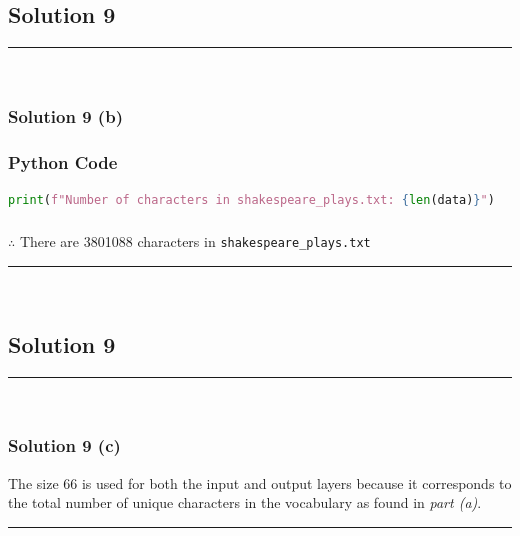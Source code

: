 \documentclass{article}
\begin{document}
\subsection*{Solution 9}
\noindent\rule{\textwidth}{0.4pt}\\
\subsubsection*{Solution 9 (b)}
\subsubsection*{Python Code}
\begin{lstlisting}[language=Python]
print(f"Number of characters in shakespeare_plays.txt: {len(data)}")
\end{lstlisting}
\subsubsection*{\normalfont}{$\therefore$ There are 3801088 characters in \texttt{shakespeare\_plays.txt}}

\noindent\rule{\textwidth}{0.4pt}\\

\newpage
\subsection*{Solution 9}
\noindent\rule{\textwidth}{0.4pt}\\
\subsubsection*{Solution 9 (c)}
The size 66 is used for both the input and output layers because it corresponds to the total number of unique characters in the vocabulary as found in \textit{part (a)}.

\noindent\rule{\textwidth}{0.4pt}
\end{document}
